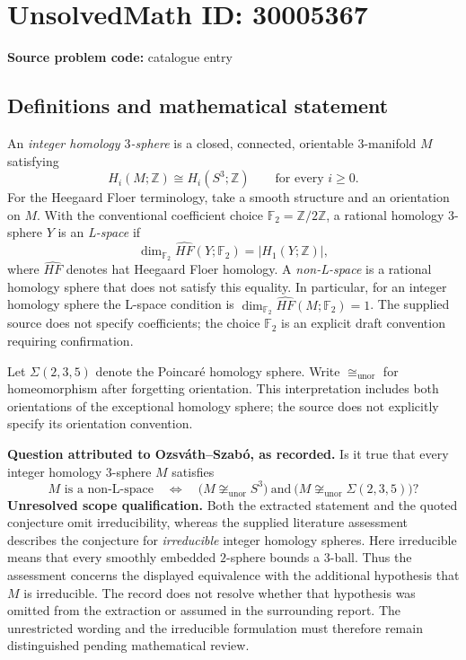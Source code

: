 \documentclass[11pt]{article}
\newcommand{\Z}{\mathbb{Z}}
\newcommand{\F}{\mathbb{F}}
\begin{document}
\section*{UnsolvedMath ID: 30005367}
\textbf{Source problem code:} catalogue entry
\subsection{Definitions and mathematical statement}
An \emph{integer homology \(3\)-sphere} is a closed, connected, orientable \(3\)-manifold \(M\) satisfying
\[
H_i(M;\Z)\cong H_i(S^3;\Z)\qquad\text{for every }i\geq 0.
\]
For the Heegaard Floer terminology, take a smooth structure and an orientation on \(M\). With the conventional coefficient choice \(\F_2=\Z/2\Z\), a rational homology \(3\)-sphere \(Y\) is an \emph{L-space} if
\[
\dim_{\F_2}\widehat{HF}(Y;\F_2)=|H_1(Y;\Z)|,
\]
where \(\widehat{HF}\) denotes hat Heegaard Floer homology. A \emph{non-L-space} is a rational homology sphere that does not satisfy this equality. In particular, for an integer homology sphere the L-space condition is \(\dim_{\F_2}\widehat{HF}(M;\F_2)=1\). The supplied source does not specify coefficients; the choice \(\F_2\) is an explicit draft convention requiring confirmation.

Let \(\Sigma(2,3,5)\) denote the Poincar\'e homology sphere. Write \(\cong_{\mathrm{unor}}\) for homeomorphism after forgetting orientation. This interpretation includes both orientations of the exceptional homology sphere; the source does not explicitly specify its orientation convention.

\textbf{Question attributed to Ozsv\'ath--Szab\'o, as recorded.} Is it true that every integer homology \(3\)-sphere \(M\) satisfies
\[
M\text{ is a non-L-space}
\quad\Longleftrightarrow\quad
\bigl(M\not\cong_{\mathrm{unor}}S^3\bigr)
\ \text{and}\ 
\bigl(M\not\cong_{\mathrm{unor}}\Sigma(2,3,5)\bigr)?
\]
\textbf{Unresolved scope qualification.} Both the extracted statement and the quoted conjecture omit irreducibility, whereas the supplied literature assessment describes the conjecture for \emph{irreducible} integer homology spheres. Here irreducible means that every smoothly embedded \(2\)-sphere bounds a \(3\)-ball. Thus the assessment concerns the displayed equivalence with the additional hypothesis that \(M\) is irreducible. The record does not resolve whether that hypothesis was omitted from the extraction or assumed in the surrounding report. The unrestricted wording and the irreducible formulation must therefore remain distinguished pending mathematical review.
\end{document}
